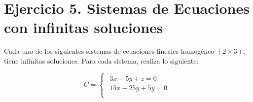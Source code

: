 
\section{\large  Ejercicio 5. Sistemas de Ecuaciones con infinitas soluciones}

Cada uno de los siguientes sistemas de ecuaciones lineales homogéneo $(2\times3)$, tiene infinitas soluciones. Para cada sistema, realiza lo siguiente:

\[
    C=
    \begin{cases}
        \begin{aligned}
            3x-5y+z=0 \\
            15x-25y+5y=0 \\
        \end{aligned}
    \end{cases}
\]

